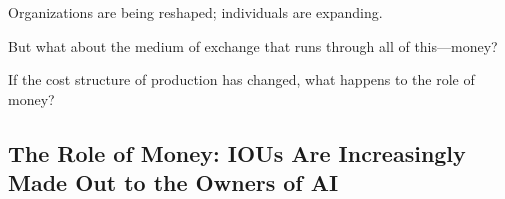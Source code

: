 

\vspace{1em}
Organizations are being reshaped; individuals are expanding.

But what about the medium of exchange that runs through all of this---money?

If the cost structure of production has changed, what happens to the role of money?


\newpage
\subsection{The Role of Money: IOUs Are Increasingly Made Out to the Owners of AI}



